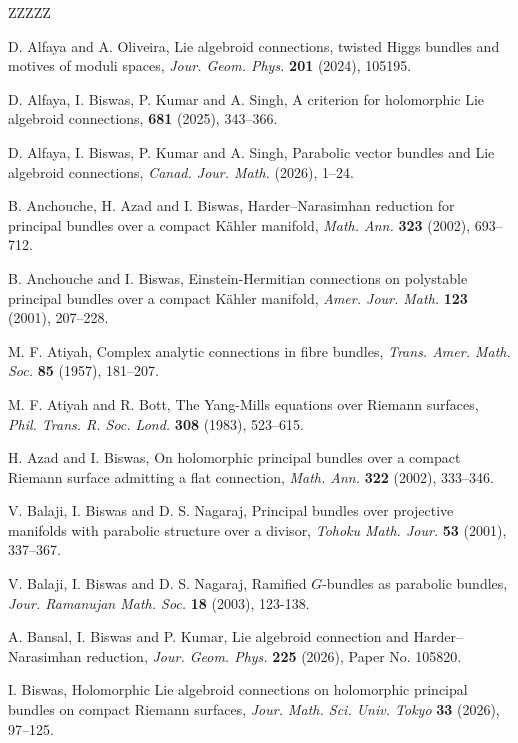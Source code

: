 \documentclass[12pt, reqno]{amsart}
\numberwithin{equation}{section}
\begin{document}
\begin{thebibliography}{ZZZZZ} 

 D. Alfaya and A. Oliveira, Lie algebroid connections, twisted Higgs bundles and motives of
moduli spaces, {\it Jour. Geom. Phys.} {\bf 201} (2024), 105195.

 D. Alfaya, I. Biswas, P. Kumar and A. Singh, A criterion for holomorphic Lie algebroid
connections, {\bf 681} (2025), 343--366.

 D. Alfaya, I. Biswas, P. Kumar and A. Singh, Parabolic vector bundles and Lie 
algebroid connections, {\it Canad. Jour. Math.} (2026), 1--24.

 B. Anchouche, H. Azad and I. Biswas,
Harder–Narasimhan reduction for principal bundles over a compact K\"ahler manifold, {\it Math. Ann.}
{\bf 323} (2002), 693--712.

 B. Anchouche and I. Biswas, Einstein-Hermitian connections on polystable principal 
bundles over a compact K\"ahler manifold, {\it Amer. Jour. Math.} {\bf 123} (2001), 207--228.

 M. F. Atiyah, Complex analytic connections in fibre bundles, {\it Trans. Amer. Math. Soc.}
{\bf 85} (1957), 181--207.

 M. F. Atiyah and R. Bott, The Yang-Mills equations over Riemann surfaces,
{\it Phil. Trans. R. Soc. Lond.} {\bf 308} (1983), 523--615. 

 H. Azad and I. Biswas, On holomorphic principal bundles over a compact Riemann surface
admitting a flat connection, {\it Math. Ann.} {\bf 322} (2002), 333--346.

 V. Balaji, I. Biswas and D. S. Nagaraj, Principal bundles over projective
manifolds with parabolic structure over a divisor, {\it Tohoku Math. Jour.} {\bf 53} (2001), 337--367.

 V. Balaji, I. Biswas and D. S. Nagaraj, Ramified $G$-bundles as parabolic bundles,
{\it Jour. Ramanujan Math. Soc.} {\bf 18} (2003), 123-138.

 A. Bansal, I. Biswas and P. Kumar, Lie algebroid connection and Harder--Narasimhan
reduction, {\it Jour. Geom. Phys.} {\bf 225} (2026), Paper No. 105820.

 I. Biswas, Holomorphic Lie algebroid connections on holomorphic principal bundles on 
compact Riemann surfaces, {\it Jour. Math. Sci. Univ. Tokyo} {\bf 33} (2026), 97--125.


\end{thebibliography}
\end{document}
